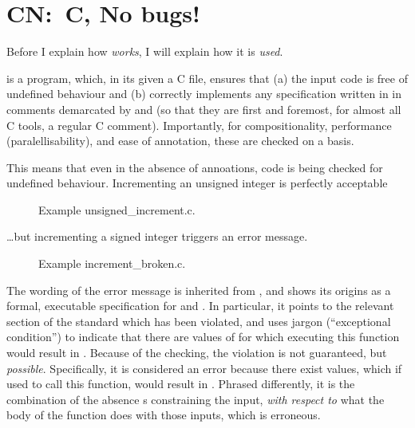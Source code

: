 \section{CN:\ C, No bugs!}

Before I explain how  \emph{works}, I will explain how it is \emph{used}.

 is a program, which, in its  given a C file, ensures that (a) the input code is free of
undefined behaviour and (b) correctly implements any specification written in
 in comments demarcated by  and 
(so that they are first and foremost, for almost all C tools, a regular C
comment). Importantly, for compositionality, performance (paralellisability),
and ease of annotation, these are checked on a  basis.

This means that even in the absence of annoations, code is being checked for
undefined behaviour. Incrementing an unsigned integer is perfectly acceptable
\begin{figure}[h]
\centering
{}
\caption{Example unsigned\_increment.c.}\label{fig:un-incr}
\end{figure}%

\ldots but incrementing a signed integer triggers an error message.%

\begin{figure}[h]
    \centering
    \caption{Example increment\_broken.c.}\label{fig:incr-broken}
\end{figure}

The wording of the error message is inherited from , and shows its
origins as a formal, executable specification for  and 
. In particular, it points to the relevant section of the standard which
has been violated, and uses jargon (``exceptional condition'') to indicate that
there are values of  for which executing this function would result
in . Because of the  checking, the violation is not
guaranteed, but \emph{possible}. Specifically, it is considered an error
because there exist values, which if used to call this function, would result
in . Phrased differently, it is the combination of the absence
s constraining the input, \emph{with respect to} what the body
of the function does with those inputs, which is erroneous.

